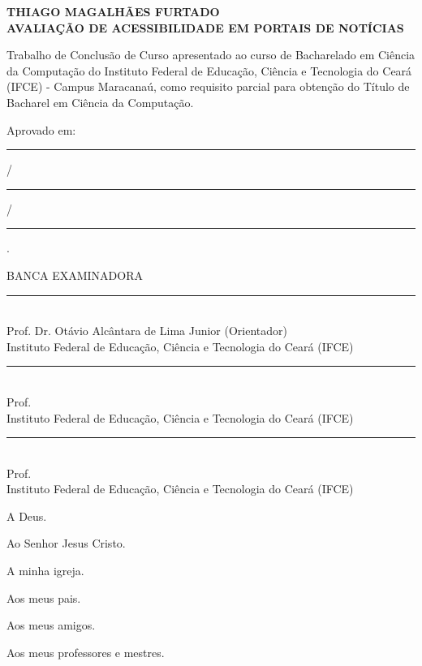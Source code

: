 \documentclass[a4paper]{article}
\begin{document}
\begin{titlepage}
	\vfill
	\begin{center}
		\onehalfspacing
		\fontsize{12pt}{0pt}\selectfont
		{\large \textbf{THIAGO MAGALHÃES FURTADO}} \\[1.5cm]
		\fontsize{12pt}{0pt}\selectfont
		{\large \textbf{AVALIAÇÃO DE ACESSIBILIDADE EM PORTAIS DE NOTÍCIAS}}\\[3cm]
		
		\hspace{.45\textwidth} %
		\begin{minipage}{.5\textwidth}
			\large Trabalho de Conclusão de Curso apresentado ao curso de Bacharelado em Ciência da Computação do Instituto Federal de Educação, Ciência e Tecnologia do Ceará (IFCE) - Campus Maracanaú, como requisito parcial para obtenção do Título de Bacharel em Ciência da Computação.\\[1cm]
		\end{minipage}
	\end{center}
	
	Aprovado em:  \rule{1cm}{0.01cm} /\rule{1cm}{0.01cm} /\rule{1cm}{0.01cm}.\\[0.5cm]
	
	\begin{center}
		\onehalfspacing
		\fontsize{12pt}{0pt}\selectfont
		{\large{BANCA EXAMINADORA}}\\[1cm]
		\rule{13cm}{0.01cm}\\[0.1cm]
		Prof. Dr. Otávio Alcântara de Lima Junior (Orientador)\\[0.1cm]
		Instituto Federal de Educação, Ciência e Tecnologia do Ceará (IFCE)\\[1.5cm]
		\rule{13cm}{0.01cm}\\[0.1cm]
		Prof. \\[0.1cm]
		Instituto Federal de Educação, Ciência e Tecnologia do Ceará (IFCE)\\[1.5cm]
		\rule{13cm}{0.01cm}\\[0.1cm]
		Prof. \\[0.1cm]
		Instituto Federal de Educação, Ciência e Tecnologia do Ceará (IFCE)\\
	\end{center}
\end{titlepage}

\begin{titlepage}
	
	\hfill \parbox{7.5cm}{A Deus.}
	
	\hfill \parbox{7.5cm}{Ao Senhor Jesus Cristo.}
	
	\hfill \parbox{7.5cm}{A minha igreja.}
	
	\hfill \parbox{7.5cm}{Aos meus pais.}

	\hfill \parbox{7.5cm}{Aos meus amigos.}
	
	\hfill \parbox{7.5cm}{Aos meus professores e mestres.}
\end{titlepage}
\end{document}
